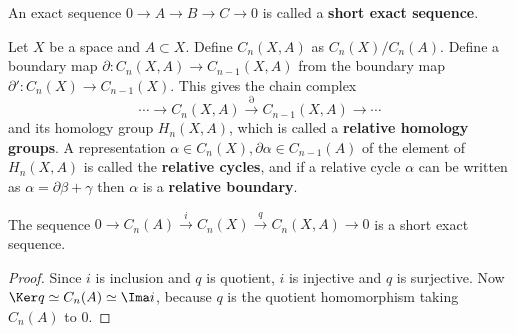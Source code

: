 \begin{defn} An exact sequence $0\rightarrow A\rightarrow B\rightarrow C\rightarrow 0$ is called a \textbf{short exact sequence}.
\end{defn}

\begin{defn} Let $X$ be a space and $A\subset X$. Define $C_n(X,A)$ as $C_n(X)/C_n(A)$. Define a boundary map $\partial:C_n(X,A)\rightarrow C_{n-1}(X,A)$ from the boundary map $\partial':C_n(X)\rightarrow C_{n-1}(X)$. This gives the chain complex
\begin{equation}
\cdots\rightarrow C_n(X,A)\xrightarrow{\partial} C_{n-1}(X,A)\rightarrow \cdots
\end{equation}
and its homology group $H_n(X,A)$, which is called a \textbf{relative homology groups}. A representation $\alpha\in C_n(X),\partial\alpha\in C_{n-1}(A)$ of the element of $H_n(X,A)$ is called the \textbf{relative cycles}, and if a relative cycle $\alpha$ can be written as $\alpha=\partial\beta+\gamma$ then $\alpha$ is a \textbf{relative boundary}.
\end{defn}

\begin{prop} The sequence $0\rightarrow C_n(A)\xrightarrow{i} C_n(X)\xrightarrow{q} C_n(X,A)\rightarrow 0$ is a short exact sequence.
\end{prop}
\begin{proof}
Since $i$ is inclusion and $q$ is quotient, $i$ is injective and $q$ is surjective. Now $\Ker q\simeq C_n(A)\simeq \Ima i$, because $q$ is the quotient homomorphism taking $C_n(A)$ to $0$.
\end{proof}

